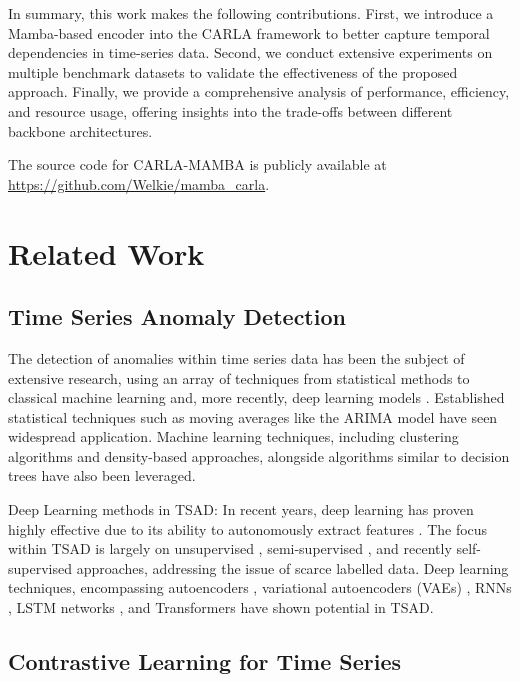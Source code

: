 \documentclass{svproc}
\begin{document}
In summary, this work makes the following contributions. First, we introduce a Mamba-based encoder into the CARLA framework to better capture temporal dependencies in time-series data. Second, we conduct extensive experiments on multiple benchmark datasets to validate the effectiveness of the proposed approach. Finally, we provide a comprehensive analysis of performance, efficiency, and resource usage, offering insights into the trade-offs between different backbone architectures.

The source code for CARLA-MAMBA is publicly available at 
\url{https://github.com/Welkie/mamba_carla}.

\section{Related Work}

\subsection{Time Series Anomaly Detection}
\label{sec:related_tsad}

The detection of anomalies within time series data has been the subject of extensive research, using an array of techniques from statistical methods to classical machine learning and, more recently, deep learning models \cite{schmidl2022anomaly}. Established statistical techniques such as moving averages like the ARIMA model \cite{box1970distribution} have seen widespread application. Machine learning techniques, including clustering algorithms and density-based approaches, alongside algorithms similar to decision trees \cite{liu2008isolation} have also been leveraged.

Deep Learning methods in TSAD: In recent years, deep learning has proven highly effective due to its ability to autonomously extract features \cite{pang2021deep}. The focus within TSAD is largely on unsupervised \cite{hundman2018detecting}, semi-supervised \cite{park2018multimodal}, and recently self-supervised \cite{yue2022ts2vec} approaches, addressing the issue of scarce labelled data. Deep learning techniques, encompassing autoencoders \cite{yao2023regularizing}, variational autoencoders (VAEs) \cite{park2018multimodal}, RNNs \cite{su2019robust}, LSTM networks \cite{hundman2018detecting}, and Transformers \cite{tuli2022tranad,xu2021anomaly} have shown potential in TSAD.

\subsection{Contrastive Learning for Time Series}
\end{document}
